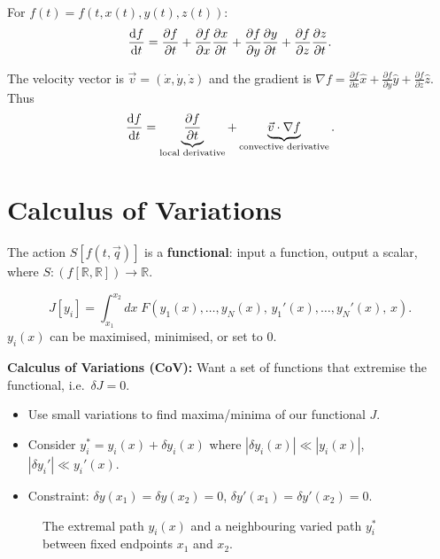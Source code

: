 For $f(t) = f(t, x(t), y(t), z(t))$:
\[
    \dv{f}{t}
    = \frac{\partial f}{\partial t}
    + \frac{\partial f}{\partial x}\frac{\partial x}{\partial t}
    + \frac{\partial f}{\partial y}\frac{\partial y}{\partial t}
    + \frac{\partial f}{\partial z}\frac{\partial z}{\partial t}.
\]

The velocity vector is $\vec{v} = (\dot{x}, \dot{y}, \dot{z})$ and the gradient is
$\nabla f = \frac{\partial f}{\partial x}\hat{x} + \frac{\partial f}{\partial y}\hat{y}
+ \frac{\partial f}{\partial z}\hat{z}$.  Thus
\[
    \dv{f}{t}
    = \underbrace{\frac{\partial f}{\partial t}}_{\text{local derivative}}
    + \underbrace{\vec{v}\cdot\nabla f}_{\text{convective derivative}}.
\]

\section{Calculus of Variations}

The action $S[f(t,\vec{q})]$ is a \textbf{functional}: input a function, output a
scalar, where $S : (f[\mathbb{R}, \mathbb{R}]) \to \mathbb{R}$.

\begin{example}
    \[
        J[y_i] = \int_{x_1}^{x_2} dx\; F\!\left(y_1(x), \ldots, y_N(x),\,
        y_1'(x), \ldots, y_N'(x),\, x\right).
    \]
    $y_i(x)$ can be maximised, minimised, or set to 0.
\end{example}

\textbf{Calculus of Variations (CoV):} Want a set of functions that extremise the
functional, i.e.\ $\delta J = 0$.

\begin{itemize}
    \item Use small variations to find maxima/minima of our functional $J$.
    \item Consider $y_i^* = y_i(x) + \delta y_i(x)$ where
        $|\delta y_i(x)| \ll |y_i(x)|$, $|\delta y_i'| \ll y_i'(x)$.
    \item Constraint: $\delta y(x_1) = \delta y(x_2) = 0$,
        $\delta y'(x_1) = \delta y'(x_2) = 0$.
\end{itemize}

\begin{figure}[H]
    \centering
    \caption{The extremal path $y_i(x)$ and a neighbouring varied path $y_i^*$ between
    fixed endpoints $x_1$ and $x_2$.}
\end{figure}

